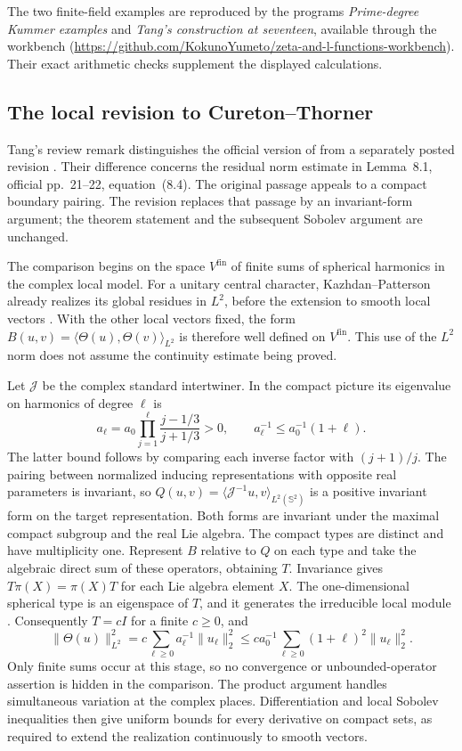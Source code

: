 \documentclass[11pt]{article}
\newcommand{\workbenchurl}{https://github.com/KokunoYumeto/zeta-and-l-functions-workbench}
\theoremstyle{definition}
\theoremstyle{remark}
\begin{document}
The two finite-field examples are reproduced by the programs \emph{Prime-degree Kummer examples} and \emph{Tang's construction at seventeen}, available through the workbench (\url{\workbenchurl}). Their exact arithmetic checks supplement the displayed calculations.

\subsection{The local revision to Cureton--Thorner}

Tang's review remark \cite[Remark~1.3, p.~2]{Tang2026} distinguishes
the official version of \cite{CT2026} from a separately posted
revision \cite{TangCTReview2026}. Their difference concerns the
residual norm estimate in Lemma~8.1, official pp.~21--22,
equation~(8.4). The original passage appeals to a compact boundary
pairing. The revision replaces that passage by an invariant-form
argument; the theorem statement and the subsequent Sobolev argument
are unchanged.

The comparison begins on the space $V^{\mathrm{fin}}$ of finite
sums of spherical harmonics in the complex local model. For a
unitary central character, Kazhdan--Patterson already realizes its
global residues in $L^2$, before the extension to smooth local
vectors \cite[Theorem~II.1.4, pp.~114--117; Theorem~II.2.1 and the
preceding paragraph, p.~118]{KP1984}. With the other local vectors
fixed, the form
$B(u,v)=\langle\Theta(u),\Theta(v)\rangle_{L^2}$ is therefore
well defined on $V^{\mathrm{fin}}$. This use of the $L^2$ norm does
not assume the continuity estimate being proved.

Let $\mathcal J$ be the complex standard intertwiner. In the
compact picture its eigenvalue on harmonics of degree $\ell$ is
\[
 a_\ell=a_0\prod_{j=1}^{\ell}
       \frac{j-1/3}{j+1/3}>0,
 \qquad a_\ell^{-1}\leq a_0^{-1}(1+\ell).
\]
The latter bound follows by comparing each inverse factor with
$(j+1)/j$. The pairing between normalized inducing representations
with opposite real parameters is invariant, so
$Q(u,v)=\langle\mathcal J^{-1}u,v\rangle_{L^2(\mathbb S^2)}$
is a positive invariant form on the target representation. Both
forms are invariant under the maximal compact subgroup and the
real Lie algebra. The compact types are distinct and have
multiplicity one. Represent $B$ relative to $Q$ on each type and
take the algebraic direct sum of these operators, obtaining $T$.
Invariance gives $T\pi(X)=\pi(X)T$ for each Lie algebra element
$X$. The one-dimensional spherical type is an eigenspace of $T$,
and it generates the irreducible local module
\cite[Theorem~I.6.4(c), p.~104]{KP1984}. Consequently $T=cI$
for a finite $c\geq0$, and
\[
 \|\Theta(u)\|_{L^2}^2
 =c\sum_{\ell\geq0}a_\ell^{-1}\|u_\ell\|_2^2
 \leq ca_0^{-1}\sum_{\ell\geq0}(1+\ell)^2\|u_\ell\|_2^2.
\]
Only finite sums occur at this stage, so no convergence or
unbounded-operator assertion is hidden in the comparison. The
product argument handles simultaneous variation at the complex
places. Differentiation and local Sobolev inequalities then give
uniform bounds for every derivative on compact sets, as required
to extend the realization continuously to smooth vectors.
\end{document}
